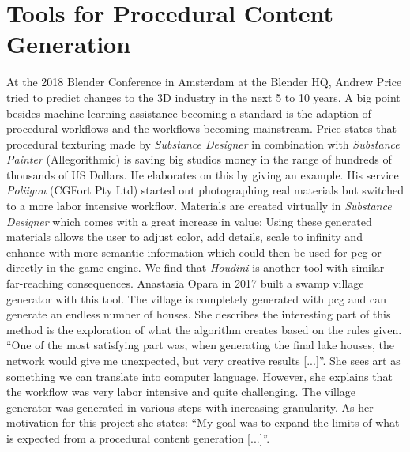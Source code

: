 \documentclass[10pt,a4paper]{article}
\begin{document}
\section{Tools for Procedural Content Generation}
\begin{multicols}{2}
At the 2018 Blender Conference in Amsterdam at the Blender HQ, Andrew Price tried to predict changes to the 3D industry in the next 5 to 10 years. A big point besides machine learning assistance becoming a standard is the adaption of procedural workflows and the workflows becoming mainstream\cite{Price2018}. Price states that procedural texturing made by \textit{Substance Designer} in combination with \textit{Substance Painter} (Allegorithmic) is saving big studios money in the range of hundreds of thousands of US Dollars. He elaborates on this by giving an example. His service \textit{Poliigon} (CGFort Pty Ltd) started out photographing real materials but switched to a more labor intensive workflow. Materials are created virtually in \textit{Substance Designer} which comes with a great increase in value: Using these generated materials allows the user to adjust color, add details, scale to infinity and enhance with more semantic information which could then be used for \gls{pcg} or directly in the game engine. We find that \textit{Houdini} is another tool with similar far-reaching consequences. Anastasia Opara in 2017 built a swamp village generator with this tool. The village is completely generated with \gls{pcg} and can generate an endless number of houses. She describes the interesting part of this method is the exploration of what the algorithm creates based on the rules given. “One of the most satisfying part was, when generating the final lake houses, the network would give me unexpected, but very creative results [...]”\cite{Opara2016}. She sees art as something we can translate into computer language. However, she explains that the workflow was very labor intensive and quite challenging. The village generator was generated in various steps with increasing granularity. As her motivation for this project she states: “My goal was to expand the limits of what is expected from a procedural content generation [...]”\cite{Opara2017}.
\end{multicols}
\end{document}
